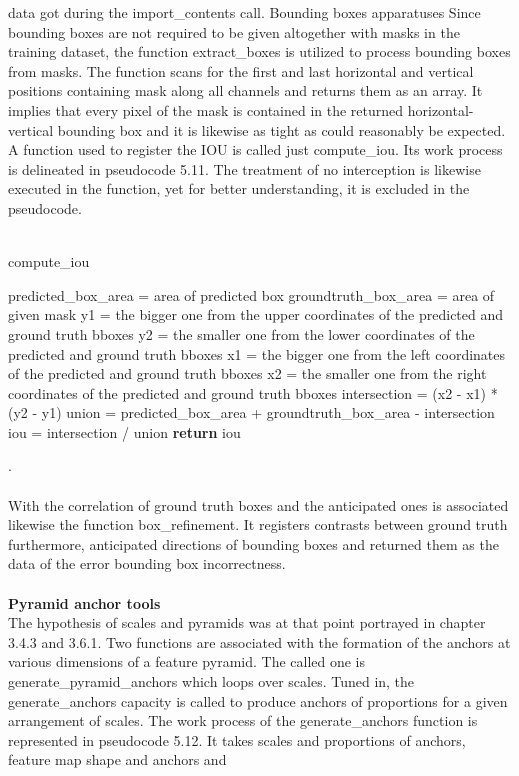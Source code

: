 data got during the import\_contents call. Bounding boxes apparatuses Since bounding boxes are not required to be given altogether with masks
in the training dataset, the function extract\_boxes is utilized to process bounding boxes from masks. The function scans for the first and last horizontal and vertical 
positions containing mask along all channels and returns them as an array. It implies that every pixel of the mask is contained in the returned horizontal-vertical bounding 
box and it is likewise as tight as could reasonably be expected. 
A function used to register the IOU is called just compute\_iou. Its work process is delineated in pseudocode 5.11. The treatment of no interception is likewise executed 
in the function, yet for better understanding, it is excluded in the pseudocode. 
\\
\\
\begin{algorithm}[H]
  \caption{compute\_iou}
  \SetAlgoLined
  \DontPrintSemicolon
   predicted\_box\_area = area of predicted box\;
groundtruth\_box\_area = area of given mask\;
y1 = the bigger one from the upper coordinates of the predicted and ground truth bboxes\;
 y2 = the smaller one from the lower coordinates of the predicted and ground truth bboxes\;
x1 = the bigger one from the left coordinates of the predicted and ground truth bboxes\;
x2 = the smaller one from the right coordinates of the predicted and ground truth bboxes\; 
intersection = (x2 - x1) * (y2 - y1)\;
union = predicted\_box\_area + groundtruth\_box\_area - intersection\;
iou = intersection / union\;
\textbf{return} iou
\end{algorithm}
.\\
\\
With the correlation of ground truth boxes and the anticipated ones is associated likewise the function box\_refinement. It registers contrasts between ground truth 
furthermore, anticipated directions of bounding boxes and returned them as the data 
of the error bounding box incorrectness. 
\\
\\
\textbf{Pyramid anchor tools }
\\
The hypothesis of scales and pyramids was at that point portrayed in chapter 3.4.3 and 3.6.1. Two functions  are associated with the formation of the anchors at various dimensions of 
a feature pyramid. The called one is generate\_pyramid\_anchors which loops over scales. Tuned in, the generate\_anchors capacity is called to produce anchors of 
proportions for a given arrangement of scales. The work process of the generate\_anchors function is represented in pseudocode 5.12. It takes scales and proportions of anchors, feature map shape and anchors and 
